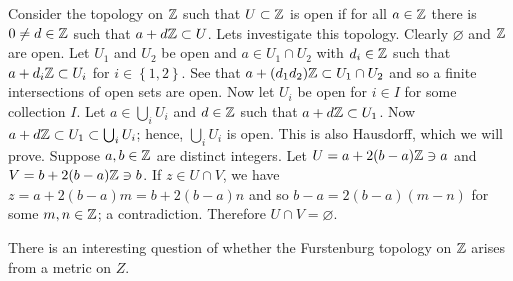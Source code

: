 \begin{example}
	Consider the topology on $\mathbb{Z}$ such that $U \subset \mathbb{Z}$ is open if for all
	$a \in \mathbb{Z}$ there is $0 \neq d \in \mathbb{Z}$ such that $a + d\mathbb{Z} \subset U$.
	Lets investigate this topology.
	Clearly $\varnothing$ and $\mathbb{Z}$ are open.
	Let $U_1$ and $U_2$ be open and $a \in U_1 \cap U_2$ with $d_i \in \mathbb{Z}$ such
	that $a + d_i\mathbb{Z} \subset U_i$ for $i \in \left\{ 1, 2 \right\}$.
	See that $a + (d_1d_2)\mathbb{Z} \subset U_1 \cap U_2$ and so a finite intersections
	of open sets are open.
	Now let $U_i$ be open for $i \in I$ for some collection $I$.
	Let $a \in \bigcup_i U_i$ and $d \in \mathbb{Z}$ such that 
	$a + d\mathbb{Z} \subset U_1$.
	Now $a + d\mathbb{Z} \subset U_1 \subset \bigcup_i U_i$; hence, $\bigcup_i U_i$ is 
	open.
	This is also Hausdorff, which we will prove.
	Suppose $a, b \in \mathbb{Z}$ are distinct integers.
	Let $U = a + 2(b-a) \mathbb{Z} \ni a$ and $V = b + 2(b-a)\mathbb{Z} \ni b$.
	If $z \in U \cap V$, we have $z = a + 2(b - a)m = b + 2(b-a)n$ and so
	$b - a = 2(b-a)(m-n)$ for some $m, n \in \mathbb{Z}$; a contradiction.
	Therefore $U \cap V = \varnothing$.
\end{example}

There is an interesting question of whether the Furstenburg topology on $\mathbb{Z}$
arises from a metric on $Z$.
